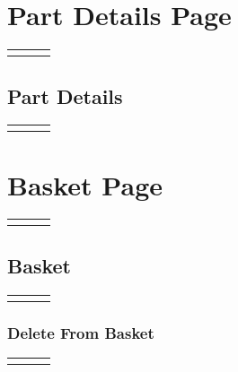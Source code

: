 \documentclass[12pt, letterpaper]{article}
\newcommand{\IPO}[3]{
  \begin{center}
    \begin{tabularx}{\linewidth}{XXX}
      \toprule
      \thead{Input} & \thead{Process} & \thead{Output} \\
      \midrule
      \RaggedRight{#1} & \RaggedRight{#2} & \RaggedRight{#3} \\
      \bottomrule
    \end{tabularx}
  \end{center}
}
\newcommand{\n}{\newline}
\begin{document}
\section{Part Details Page} %

\IPO{Catalog part click}{Render navigation bar (\ref{navbar})\n Render part details}{Part details page}

\subsection{Part Details}

\IPO{Part (\texttt{object})}{Render complete part name, description, stock, and image\n Render quantity selector (range from 1 to part's stock)\n Render ``add to basket'' button with specified quantity (\ref{ATB})}{Part details}

\section{Basket Page}

\IPO{``Basket'' button}{Render navigation bar (\ref{navbar})\n Render basket}{Basket page}

\subsection{Basket}

\IPO{Basket entry in browser's local storage (\texttt{string} or \texttt{null})}{\textbf{IF} basket is \texttt{null} \textbf{OR} empty\n$\Rightarrow$Render ``empty'' \n\textbf{ELSE}\n$\Rightarrow$Parse basket to \texttt{object[]}\n$\Rightarrow$\textbf{FOR} each part in basket\n$\Rightarrow\Rightarrow$Render thumbnail \& title\n$\Rightarrow\Rightarrow$Render quantity selector (range from 1 to part's stock)\n$\Rightarrow\Rightarrow$Render ``delete'' button\n$\Rightarrow$Render ``clear basket'' button\n$\Rightarrow$Render ``checkout'' button}{Basket}

\subsubsection{Delete From Basket}

\IPO{\begin{itemize}\item Basket entry in browser's local storage (\texttt{string} or \texttt{null})\item Basket part\item ``Delete' button'\end{itemize}}{Parse basket to an \texttt{object[]}, or create a new array if \texttt{null} or empty\n Remove part \& quantity from basket array\n Convert basket array back to string\n Overwrite basket in browser's local storage with new basket string}{New basket}
\end{document}
